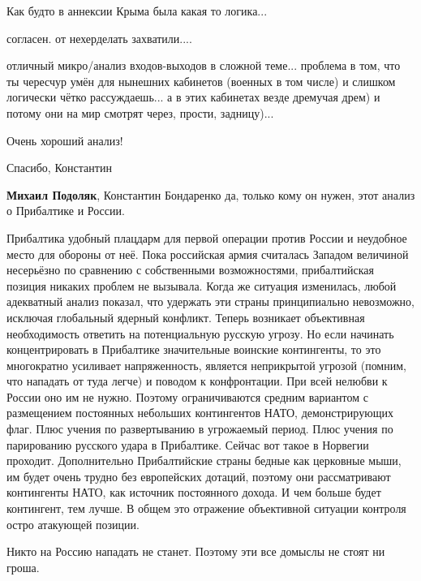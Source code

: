 \begin{itemize}
\begin{itemize}
\end{itemize} %

Как будто в аннексии Крыма была какая то логика...

согласен. от нехерделать захватили....


отличный микро/анализ входов-выходов в сложной теме... проблема в том, что ты чересчур умён для нынешних кабинетов (военных в том числе) и слишком логически чётко рассуждаешь... а в этих кабинетах везде дремучая дрем) и потому они на мир смотрят через, прости, задницу)...


Очень хороший анализ!

Спасибо, Константин

\textbf{Михаил Подоляк}, Константин Бондаренко да, только кому он нужен, этот анализ о Прибалтике и России.


Прибалтика удобный плацдарм для первой операции против России и неудобное место
для обороны от неё. Пока российская армия считалась Западом величиной
несерьёзно по сравнению с собственными возможностями, прибалтийская позиция
никаких проблем не вызывала. Когда же ситуация изменилась, любой адекватный
анализ показал, что удержать эти страны принципиально невозможно, исключая
глобальный ядерный конфликт. Теперь возникает объективная необходимость
ответить на потенциальную русскую угрозу. Но если начинать концентрировать в
Прибалтике значительные воинские контингенты, то это многократно усиливает
напряженность, является неприкрытой угрозой (помним, что нападать от туда
легче) и поводом к конфронтации. При всей нелюбви к России оно им не нужно.
Поэтому ограничиваются средним вариантом с размещением постоянных небольших
контингентов НАТО, демонстрирующих флаг. Плюс учения по развертыванию в
угрожаемый период. Плюс учения по парированию русского удара в Прибалтике.
Сейчас вот такое в Норвегии проходит. Дополнительно Прибалтийские страны бедные
как церковные мыши, им будет очень трудно без европейских дотаций, поэтому они
рассматривают контингенты НАТО, как источник постоянного дохода. И чем больше
будет контингент, тем лучше. В общем это отражение объективной ситуации
контроля остро атакующей позиции.

\begin{itemize} %
Никто на Россию нападать не станет. Поэтому эти все домыслы не стоят ни гроша.


\end{itemize}
\end{itemize}
